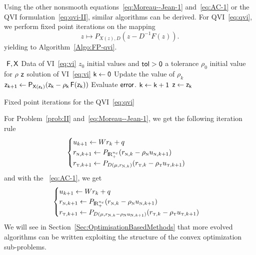 Using the other nonsmooth equations~\eqref{eq:Moreau--Jean-1} and~\eqref{eq:AC-1} or the QVI formulation~\eqref{eq:qvi-II}, similar algorithms can be derived. For QVI~\eqref{eq:qvi}, we perform fixed point iterations on the mapping
\begin{equation}
  \label{eq:skew-fixed-point-qvi}
   z \mapsto P_{X(z),D}(z-D^{-1} F(z)).
\end{equation}
yielding to Algorithm~\ref{Algo:FP-qvi}. 
\begin{algorithm}
  \begin{algorithmic}
    {\sf
      \STATE $ $
      \REQUIRE $\sf F,X$ Data of VI~\eqref{eq:vi}
      \REQUIRE $z_0$ initial values and $\sf tol >0$ a tolerance  
      \REQUIRE $\rho_0$ initial value for $\rho$
      \ENSURE  $\sf z$ solution of VI~\eqref{eq:vi}
      \STATE   $\sf k \leftarrow 0$ 
      \STATE Update the value of $\rho_k$
      \STATE $\sf z_{k+1} \leftarrow P_{X(z_k)}(z_k - \rho_k\,F(z_k))$
      \STATE Evaluate $\sf error$.
      \STATE $\sf k \leftarrow k+1$
      \ENDWHILE
      \STATE $\sf z \leftarrow z_{k}$ 
    }
  \end{algorithmic}
  \caption{Fixed point iterations for the QVI~\eqref{eq:qvi}}  \label{Algo:FP-qvi}
\end{algorithm}
For Problem~\ref{prob:II} and~\eqref{eq:Moreau--Jean-1}, we get the following iteration rule
\begin{equation}
  \label{eq:FP-MJ-II}
  \begin{cases}
    u_{k+1} \leftarrow W r_{k} +q\\
    r_{\n,k+1} \leftarrow P_{\RR^{n_c}_+}(r_{\n,k} -\rho_\n u_{\n,k+1}) \\
    r_{\t,k+1} \leftarrow P_{D(\mu,r_{\n,k})}(r_{\t,k}-\rho_\t u_{\t,k+1})
  \end{cases}
\end{equation}
and with the ~\eqref{eq:AC-1}, we get
\begin{equation}
  \label{eq:FP-AC-II}
  \begin{cases}
    u_{k+1} \leftarrow W r_{k} +q\\
    r_{\n,k+1} \leftarrow P_{\RR^{n_c}_+}(r_{\n,k} -\rho_\n u_{\n,k+1}) \\
    r_{\t,k+1} \leftarrow P_{D(\mu,r_{\n,k}-\rho_\n u_{\n,k+1} )}(r_{\t,k}-\rho_\t u_{\t,k+1})
  \end{cases}
\end{equation}
We will see in Section~\ref{Sec:OptimisationBasedMethods} that more evolved algorithms can be written exploiting the structure of the convex optimization sub-problems.


